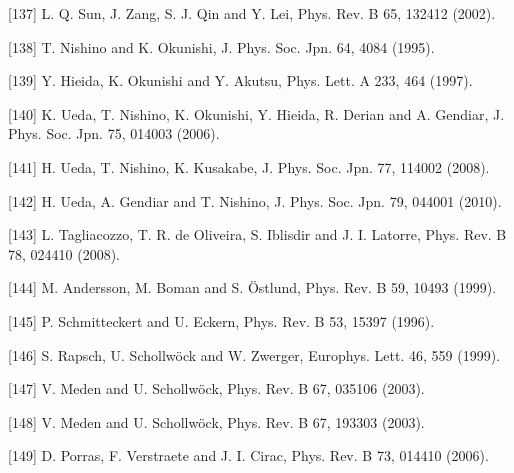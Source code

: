 \documentclass[12pt]{article}
\begin{document}
[137] L. Q. Sun, J. Zang, S. J. Qin and Y. Lei, Phys. Rev. B 65, 132412 (2002).

[138] T. Nishino and K. Okunishi, J. Phys. Soc. Jpn. 64, 4084 (1995).

[139] Y. Hieida, K. Okunishi and Y. Akutsu, Phys. Lett. A 233, 464 (1997).

[140] K. Ueda, T. Nishino, K. Okunishi, Y. Hieida, R. Derian and A. Gendiar, J. Phys. Soc. Jpn. 75, 014003 (2006).

[141] H. Ueda, T. Nishino, K. Kusakabe, J. Phys. Soc. Jpn. 77, 114002 (2008).

[142] H. Ueda, A. Gendiar and T. Nishino, J. Phys. Soc. Jpn. 79, 044001 (2010).

[143] L. Tagliacozzo, T. R. de Oliveira, S. Iblisdir and J. I. Latorre, Phys. Rev. B 78, 024410 (2008).

[144] M. Andersson, M. Boman and S. Östlund, Phys. Rev. B 59, 10493 (1999).

[145] P. Schmitteckert and U. Eckern, Phys. Rev. B 53, 15397 (1996).

[146] S. Rapsch, U. Schollwöck and W. Zwerger, Europhys. Lett. 46, 559 (1999).

[147] V. Meden and U. Schollwöck, Phys. Rev. B 67, 035106 (2003).

[148] V. Meden and U. Schollwöck, Phys. Rev. B 67, 193303 (2003).

[149] D. Porras, F. Verstraete and J. I. Cirac, Phys. Rev. B 73, 014410 (2006).
\end{document}
